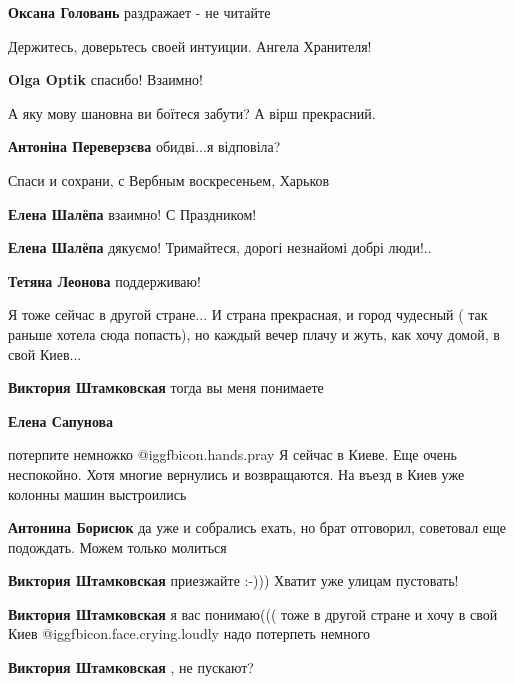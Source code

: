 \begin{itemize}
\textbf{Оксана Головань} раздражает - не читайте

Держитесь, доверьтесь своей интуиции. Ангела Хранителя!

\textbf{Olga Optik} спасибо! Взаимно!

А яку мову шановна ви боїтеся забути? А вірш прекрасний.

\textbf{Антоніна Переверзєва} обидві...я відповіла?

Спаси и сохрани, с Вербным воскресеньем, Харьков

\begin{itemize} %
\textbf{Елена Шалёпа} взаимно! С Праздником!

\textbf{Елена Шалёпа} дякуємо! Тримайтеся, дорогі незнайомі добрі люди!..

\textbf{Тетяна Леонова} поддерживаю!
\end{itemize} %


Я тоже сейчас в другой стране... И страна прекрасная, и город чудесный ( так
раньше хотела сюда попасть), но каждый вечер плачу и жуть, как хочу домой, в
свой Киев...

\begin{itemize} %
\textbf{Виктория Штамковская} тогда вы меня понимаете

\textbf{Елена Сапунова} 

потерпите немножко  @igg{fbicon.hands.pray}  Я сейчас в Киеве. Еще очень неспокойно. Хотя многие
вернулись и возвращаются. На въезд в Киев уже колонны машин выстроились


\textbf{Антонина Борисюк} да уже и собрались ехать, но брат отговорил, советовал еще подождать. Можем только молиться

\textbf{Виктория Штамковская} приезжайте :-)))
Хватит уже улицам пустовать!

\textbf{Виктория Штамковская} я вас понимаю((( тоже в другой стране и хочу в свой Киев @igg{fbicon.face.crying.loudly} надо потерпеть немного

\textbf{Виктория Штамковская} , не пускают?
\end{itemize} %



\end{itemize}

